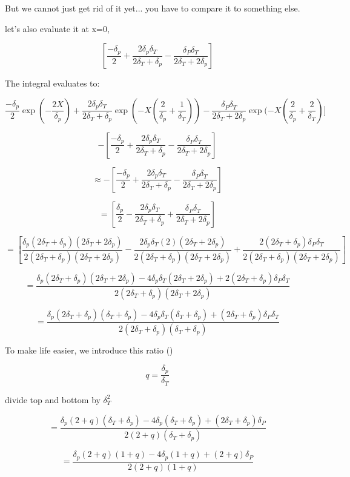 \documentclass[11pt]{article}
\begin{document}
But we cannot just get rid of it yet... you have to compare it to something else.

let's also evaluate it at x=0,

$$[  \frac{-\delta_p}{2}  + \frac{2\delta_p \delta_T}{2\delta_T + \delta_p} - \frac{\delta_P \delta_T}{2 \delta_T + 2\delta_p}  ]$$

The integral evaluates to:

$$  \frac{-\delta_p}{2} \exp (-\frac{2X}{\delta_p}) + \frac{2\delta_p \delta_T}{2\delta_T + \delta_p} \exp (-X(\frac{2}{\delta_p} + \frac{1}{\delta_T}))  - \frac{\delta_P \delta_T}{2 \delta_T + 2\delta_p}  \exp (-X(\frac{2}{\delta_p}+\frac{2}{\delta_T}) ] $$

$$ - [  \frac{-\delta_p}{2}  + \frac{2\delta_p \delta_T}{2\delta_T + \delta_p} - \frac{\delta_P \delta_T}{2 \delta_T + 2\delta_p}  ]$$

$$\approx - [  \frac{-\delta_p}{2}  + \frac{2\delta_p \delta_T}{2\delta_T + \delta_p} - \frac{\delta_P \delta_T}{2 \delta_T + 2\delta_p}  ]$$

$$=  [  \frac{\delta_p}{2}  - \frac{2\delta_p \delta_T}{2\delta_T + \delta_p} + \frac{\delta_P \delta_T}{2 \delta_T + 2\delta_p}  ]$$

$$=  [  \frac{\delta_p(2\delta_T + \delta_p)(2 \delta_T + 2\delta_p)}{2(2\delta_T + \delta_p)(2 \delta_T + 2\delta_p)}  - \frac{2\delta_p \delta_T(2)(2 \delta_T + 2\delta_p)}{2(2\delta_T + \delta_p)(2 \delta_T + 2\delta_p)} + \frac{2(2\delta_T+\delta_p) \delta_P \delta_T}{2(2\delta_T+\delta_p)(2 \delta_T + 2\delta_p)}  ]$$

$$= \frac{\delta_p(2\delta_T + \delta_p)(2 \delta_T + 2\delta_p)-4\delta_p \delta_T(2 \delta_T + 2\delta_p)+2(2\delta_T+\delta_p) \delta_P \delta_T}{2(2\delta_T+\delta_p)(2 \delta_T + 2\delta_p)}$$

$$= \frac{\delta_p(2\delta_T + \delta_p)( \delta_T + \delta_p)-4\delta_p \delta_T( \delta_T + \delta_p)+(2\delta_T+\delta_p) \delta_P \delta_T}{2(2\delta_T+\delta_p)( \delta_T + \delta_p)}$$

To make life easier, we introduce this ratio (\cite{bejan2013convection})

$$q = \frac{\delta_p	}{\delta_T}$$

divide top and bottom by $\delta_T^2$

$$= \frac{\delta_p(2+ q)( \delta_T + \delta_p)-4\delta_p( \delta_T + \delta_p)+(2\delta_T+\delta_p) \delta_P }{2(2+q)( \delta_T + \delta_p)}$$

$$= \frac{\delta_p(2+ q)(1+q)-4\delta_p(1+q)+(2+q) \delta_P }{2(2+q)(1+ q)}$$
\end{document}
